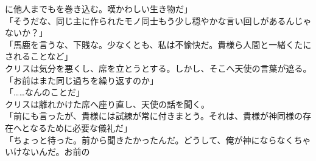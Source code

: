 \documentclass[b5j,10pt,openany]{jsbook}
\begin{document}
に他人までもを巻き込む。嘆かわしい生き物だ」\\「そうだな、同じ主に作られたモノ同士もう少し穏やかな言い回しがあるんじゃないか？」\\「馬鹿を言うな、下賎な。少なくとも、私は不愉快だ。貴様ら人間と一緒くたにされることなど」\\クリスは気分を悪くし、席を立とうとする。しかし、そこへ天使の言葉が遮る。\\「お前はまた同じ過ちを繰り返すのか」\\「\ldots{}\ldots{}なんのことだ」\\クリスは離れかけた席へ座り直し、天使の話を聞く。\\「前にも言ったが、貴様には試練が常に付きまとう。それは、貴様が神同様の存在へとなるために必要な儀礼だ」\\「ちょっと待った。前から聞きたかったんだ。どうして、俺が神にならなくちゃいけないんだ。お前の
\end{document}
